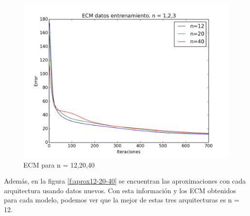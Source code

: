 \documentclass[a4paper]{article}
\begin{document}
	\begin{figure}[H]
	  \centering
	  \includegraphics[scale=0.4]{graficas/n12-20-40_train.png}
	  \caption{ECM para n = 12,20,40}
	  \label{fig:n12-20-40_train}
	\end{figure}

Además, en la figura \ref{f:aprox12-20-40} se encuentran las aproximaciones con cada arquitectura usando datos nuevos. Con esta información y los ECM obtenidos para cada modelo, podemos ver que la mejor de estas tres arquitecturas es n = 12.
\end{document}
